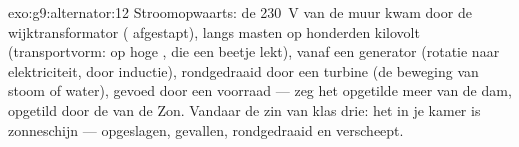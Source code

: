 \begin{solution}{exo:g9:alternator:12}
Stroomopwaarts: de \qty{230}{V} van de muur kwam door de
wijktransformator ( afgestapt), langs masten op honderden
kilovolt (transportvorm:  op hoge
, die een beetje  lekt), vanaf een
generator (rotatie naar elektriciteit, door inductie),
rondgedraaid door een turbine (de beweging van stoom of water), gevoed
door een voorraad --- zeg het opgetilde meer van de dam, opgetild door
de  van de Zon. Vandaar de zin van klas drie: het
 in je kamer is zonneschijn --- opgeslagen, gevallen,
rondgedraaid en verscheept.
\end{solution}

